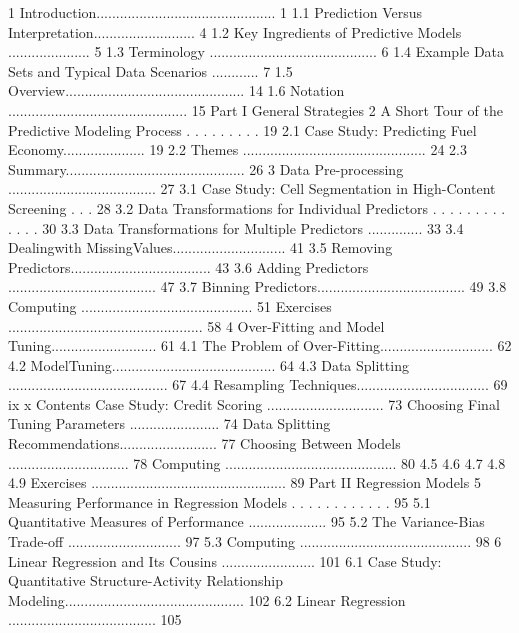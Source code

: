 
1 Introduction.............................................. 1
1.1 Prediction Versus Interpretation.......................... 4
1.2 Key Ingredients of Predictive Models ..................... 5
1.3 Terminology ........................................... 6
1.4 Example Data Sets and Typical Data Scenarios ............ 7
1.5 Overview.............................................. 14
1.6 Notation .............................................. 15
Part I General Strategies
2 A Short Tour of the Predictive Modeling Process . . . . . . . . . 19
2.1 Case Study: Predicting Fuel Economy..................... 19
2.2 Themes ............................................... 24
2.3 Summary.............................................. 26
3 Data Pre-processing ...................................... 27
3.1 Case Study: Cell Segmentation in High-Content Screening . . . 28
3.2 Data Transformations for Individual Predictors . . . . . . . . . . . . . 30
3.3 Data Transformations for Multiple Predictors .............. 33
3.4 Dealingwith MissingValues............................. 41
3.5 Removing Predictors.................................... 43
3.6 Adding Predictors ...................................... 47
3.7 Binning Predictors...................................... 49
3.8 Computing ............................................ 51
Exercises .................................................. 58
4 Over-Fitting and Model Tuning........................... 61
4.1 The Problem of Over-Fitting............................. 62
4.2 ModelTuning.......................................... 64
4.3 Data Splitting ......................................... 67
4.4 Resampling Techniques.................................. 69
ix
x
Contents
Case Study: Credit Scoring .............................. 73 Choosing Final Tuning Parameters ....................... 74 Data Splitting Recommendations......................... 77 Choosing Between Models ............................... 78 Computing ............................................ 80
4.5
4.6
4.7
4.8
4.9
Exercises .................................................. 89
Part II Regression Models
5 Measuring Performance in Regression Models . . . . . . . . . . . . 95
5.1 Quantitative Measures of Performance .................... 95
5.2 The Variance-Bias Trade-off ............................. 97
5.3 Computing ............................................ 98
6 Linear Regression and Its Cousins ........................ 101
6.1 Case Study: Quantitative Structure-Activity Relationship
Modeling.............................................. 102
6.2 Linear Regression ...................................... 105
